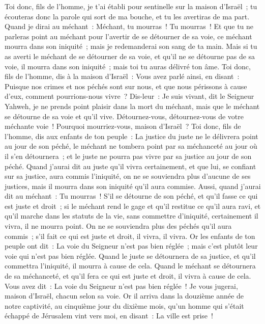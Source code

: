 \begin{multicols}{2}
Toi donc, fils de l'homme, je t'ai établi pour sentinelle sur la maison d'Israël~; tu écouteras donc la parole qui sort de ma bouche, et tu les avertiras de ma part.
Quand je dirai au méchant~: Méchant, tu mourras~! Tu mourras~! Et que tu ne parleras point au méchant pour l'avertir de se détourner de sa voie, ce méchant mourra dans son iniquité~; mais je redemanderai son sang de ta main.
Mais si tu as averti le méchant de se détourner de sa voie, et qu'il ne se détourne pas de sa voie, il mourra dans son iniquité~; mais toi tu auras délivré ton âme.
Toi donc, fils de l'homme, dis à la maison d'Israël~: Vous avez parlé ainsi, en disant~: Puisque nos crimes et nos péchés sont sur nous, et que nous périssons à cause d'eux, comment pourrions-nous vivre~?
Dis-leur~: Je suis vivant, dit le Seigneur Yahweh, je ne prends point plaisir dans la mort du méchant, mais que le méchant se détourne de sa voie et qu'il vive. Détournez-vous, détournez-vous de votre méchante voie~! Pourquoi mourriez-vous, maison d'Israël~?
Toi donc, fils de l'homme, dis aux enfants de ton peuple~: La justice du juste ne le délivrera point au jour de son péché, le méchant ne tombera point par sa méchanceté au jour où il s'en détournera~; et le juste ne pourra pas vivre par sa justice au jour de son péché.
Quand j'aurai dit au juste qu'il vivra certainement, et que lui, se confiant sur sa justice, aura commis l'iniquité, on ne se souviendra plus d'aucune de ses justices, mais il mourra dans son iniquité qu'il aura commise.
Aussi, quand j'aurai dit au méchant~: Tu mourras~! S'il se détourne de son péché, et qu'il fasse ce qui est juste et droit~;
si le méchant rend le gage et qu'il restitue ce qu'il aura ravi, et qu'il marche dans les statuts de la vie, sans commettre d'iniquité, certainement il vivra, il ne mourra point.
On ne se souviendra plus des péchés qu'il aura commis~; s'il fait ce qui est juste et droit, il vivra, il vivra.
Or les enfants de ton peuple ont dit~: La voie du Seigneur n'est pas bien réglée~; mais c'est plutôt leur voie qui n'est pas bien réglée.
Quand le juste se détournera de sa justice, et qu'il commettra l'iniquité, il mourra à cause de cela.
Quand le méchant se détournera de sa méchanceté, et qu'il fera ce qui est juste et droit, il vivra à cause de cela.
Vous avez dit~: La voie du Seigneur n'est pas bien réglée~! Je vous jugerai, maison d'Israël, chacun selon sa voie.
Or il arriva dans la douzième année de notre captivité, au cinquième jour du dixième mois, qu'un homme qui s'était échappé de Jérusalem vint vers moi, en disant~: La ville est prise~!

\end{multicols}
